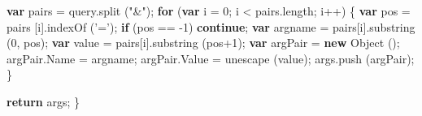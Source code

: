 \documentclass[]{article}
\newenvironment{Shaded}{}{}
\newcommand{\KeywordTok}[1]{\textcolor[rgb]{0.00,0.44,0.13}{\textbf{{#1}}}}
\newcommand{\DecValTok}[1]{\textcolor[rgb]{0.25,0.63,0.44}{{#1}}}
\newcommand{\StringTok}[1]{\textcolor[rgb]{0.25,0.44,0.63}{{#1}}}
\newcommand{\OtherTok}[1]{\textcolor[rgb]{0.00,0.44,0.13}{{#1}}}
\newcommand{\FunctionTok}[1]{\textcolor[rgb]{0.02,0.16,0.49}{{#1}}}
\newcommand{\NormalTok}[1]{{#1}}
\begin{document}
\begin{Shaded}
\begin{Highlighting}[]
  \KeywordTok{var} \NormalTok{pairs = }\OtherTok{query}\NormalTok{.}\FunctionTok{split} \NormalTok{(}\StringTok{"&"}\NormalTok{);}
  \KeywordTok{for} \NormalTok{(}\KeywordTok{var} \NormalTok{i = }\DecValTok{0}\NormalTok{; i < }\OtherTok{pairs}\NormalTok{.}\FunctionTok{length}\NormalTok{; i++)}
    \NormalTok{\{   }
      \KeywordTok{var} \NormalTok{pos = pairs [i].}\FunctionTok{indexOf} \NormalTok{(}\StringTok{'='}\NormalTok{);}
      \KeywordTok{if} \NormalTok{(pos == -}\DecValTok{1}\NormalTok{) }\KeywordTok{continue}\NormalTok{;}
      \KeywordTok{var} \NormalTok{argname = pairs[i].}\FunctionTok{substring} \NormalTok{(}\DecValTok{0}\NormalTok{, pos);}
      \KeywordTok{var} \NormalTok{value = pairs[i].}\FunctionTok{substring} \NormalTok{(pos}\DecValTok{+1}\NormalTok{);}
      \KeywordTok{var} \NormalTok{argPair = }\KeywordTok{new} \FunctionTok{Object} \NormalTok{();}
      \OtherTok{argPair}\NormalTok{.}\FunctionTok{Name} \NormalTok{= argname;}
      \OtherTok{argPair}\NormalTok{.}\FunctionTok{Value} \NormalTok{= }\FunctionTok{unescape} \NormalTok{(value);}
      \OtherTok{args}\NormalTok{.}\FunctionTok{push} \NormalTok{(argPair);}
    \NormalTok{\}}
  
  \KeywordTok{return} \NormalTok{args;}
\NormalTok{\}}


\end{Highlighting}
\end{Shaded}
\end{document}
